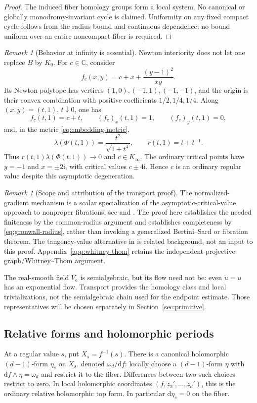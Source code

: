\documentclass[11pt]{article}
\numberwithin{equation}{section}
\theoremstyle{definition}
\theoremstyle{remark}
\newtheorem{remark}[theorem]{Remark}
\newcommand{\C}{\mathbb C}
\newcommand{\dd}{\mathrm d}
\newcommand{\ii}{\mathrm i}
\newcommand{\omegaD}{\omega_d}
\begin{document}
\begin{proof}
The induced fiber homology groups form a local system. No canonical or
globally monodromy-invariant cycle is claimed. Uniformity on any fixed
compact cycle follows from the radius bound and continuous dependence;
no bound uniform over an entire noncompact fiber is required.
\end{proof}

\begin{remark}[Behavior at infinity is essential]\label{rem:asymptotic-example}
Newton interiority does not let one replace $B$ by $K_0$. For $c\in\C$,
consider
\[
 f_c(x,y)=c+x+\frac{(y-1)^2}{xy}.
\]
Its Newton polytope has vertices $(1,0),(-1,1),(-1,-1)$, and the origin
is their convex combination with positive coefficients $1/2,1/4,1/4$.
Along $(x,y)=(t,1)$, $t\downarrow0$, one has
\[
 f_c(t,1)=c+t,\qquad (f_c)_x(t,1)=1,\qquad (f_c)_y(t,1)=0,
\]
and, in the metric \eqref{eq:embedding-metric},
\[
 \lambda(\Phi(t,1))=\frac{t^2}{\sqrt{1+t^4}},\qquad
 r(t,1)=t+t^{-1}.
\]
Thus $r(t,1)\lambda(\Phi(t,1))\to0$ and $c\in K_\infty$.
The ordinary critical points have $y=-1$ and $x=\pm2\ii$, with critical
values $c\pm4\ii$. Hence $c$ is an ordinary regular value despite this
asymptotic degeneration.
\end{remark}
\begin{remark}[Scope and attribution of the transport proof]\label{rem:transport-background}
The normalized-gradient mechanism is a scalar specialization of the
asymptotic-critical-value approach to nonproper fibrations; see
\cite[Section 3]{Jelonek04} and \cite{KOS}. The proof here establishes the
needed finiteness by the common-radius argument and establishes
completeness by \eqref{eq:gronwall-radius}, rather than invoking a
generalized Bertini--Sard or fibration theorem. The tangency-value
alternative in \cite[Theorem 3.1]{NPP} is related background, not an
input to this proof. Appendix~\ref{app:whitney-thom} retains the independent
projective-graph/Whitney--Thom argument.

The real-smooth field $V_a$ is semialgebraic, but its flow need not be:
even $\dot u=u$ has an exponential flow. Transport provides the homology
class and local trivializations, not the semialgebraic chain used for the
endpoint estimate. Those representatives will be chosen separately in
Section~\ref{sec:primitive}.
\end{remark}

\subsection{Relative forms and holomorphic periods}
At a regular value $s$, put $X_s=f^{-1}(s)$. There is a canonical
holomorphic $(d-1)$-form $\eta_s$ on $X_s$, denoted $\omegaD/\dd f$:
locally choose a $(d-1)$-form $\eta$ with
$\dd f\wedge\eta=\omegaD$ and restrict it to the fiber. Differences
between two such choices restrict to zero. In local holomorphic
coordinates $(f,z_2',\ldots,z_d')$, this is the ordinary relative
holomorphic top form. In particular $\dd\eta_s=0$ on the fiber.
\end{document}

